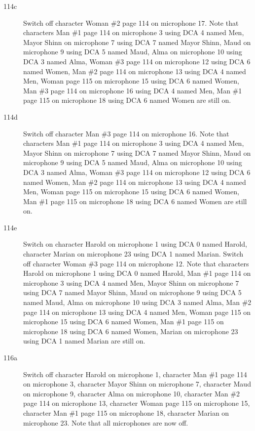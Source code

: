 \begin{description}
\item[114c]
Switch off character Woman \#2 page 114 on microphone 17. Note that characters Man \#1 page 114 on microphone 3 using DCA 4 named Men, Mayor Shinn on microphone 7 using DCA 7 named Mayor Shinn, Maud on microphone 9 using DCA 5 named Maud, Alma on microphone 10 using DCA 3 named Alma, Woman \#3 page 114 on microphone 12 using DCA 6 named Women, Man \#2 page 114 on microphone 13 using DCA 4 named Men, Woman page 115 on microphone 15 using DCA 6 named Women, Man \#3 page 114 on microphone 16 using DCA 4 named Men, Man \#1 page 115 on microphone 18 using DCA 6 named Women are still on.  

\item[114d]
Switch off character Man \#3 page 114 on microphone 16. Note that characters Man \#1 page 114 on microphone 3 using DCA 4 named Men, Mayor Shinn on microphone 7 using DCA 7 named Mayor Shinn, Maud on microphone 9 using DCA 5 named Maud, Alma on microphone 10 using DCA 3 named Alma, Woman \#3 page 114 on microphone 12 using DCA 6 named Women, Man \#2 page 114 on microphone 13 using DCA 4 named Men, Woman page 115 on microphone 15 using DCA 6 named Women, Man \#1 page 115 on microphone 18 using DCA 6 named Women are still on.  

\item[114e]
Switch on character Harold on microphone 1 using DCA 0 named Harold, character Marian on microphone 23 using DCA 1 named Marian. Switch off character Woman \#3 page 114 on microphone 12. Note that characters Harold on microphone 1 using DCA 0 named Harold, Man \#1 page 114 on microphone 3 using DCA 4 named Men, Mayor Shinn on microphone 7 using DCA 7 named Mayor Shinn, Maud on microphone 9 using DCA 5 named Maud, Alma on microphone 10 using DCA 3 named Alma, Man \#2 page 114 on microphone 13 using DCA 4 named Men, Woman page 115 on microphone 15 using DCA 6 named Women, Man \#1 page 115 on microphone 18 using DCA 6 named Women, Marian on microphone 23 using DCA 1 named Marian are still on.  

\item[116a]
Switch off character Harold on microphone 1, character Man \#1 page 114 on microphone 3, character Mayor Shinn on microphone 7, character Maud on microphone 9, character Alma on microphone 10, character Man \#2 page 114 on microphone 13, character Woman page 115 on microphone 15, character Man \#1 page 115 on microphone 18, character Marian on microphone 23. Note that all microphones are now off.

\end{description}
